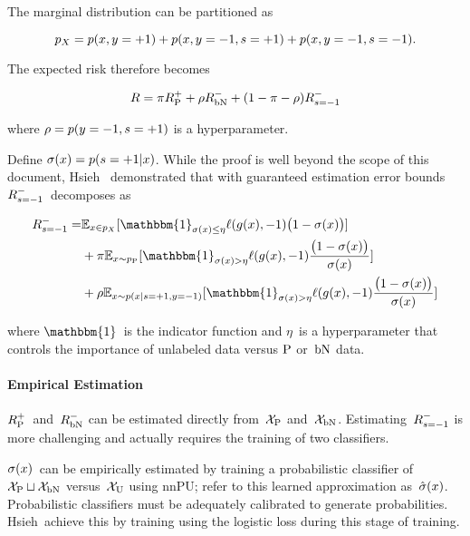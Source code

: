 The marginal distribution can be partitioned as

\begin{equation*}
  p_{X} = p(x, y = {+}1) + p(x, y = {-}1, s = {+}1) + p(x, y = {-}1, s = {-}1) \text{.}
\end{equation*}

\noindent
The expected risk therefore becomes

\begin{equation}\label{eq:Risk:WithBN}
  R = \pi R_{\textnormal{P}}^{{+}} + \rho R_{\textnormal{bN}}^{{-}} + (1 - \pi - \rho) R_{s = {-}1}^{-}
\end{equation}

\noindent
where ${\rho = p(y = {-}1, s = {+}1)}$ is a hyperparameter.

Define ${\sigma(x) = p(s = {+}1 \vert x)}$.  While the proof is well beyond the scope of this document, Hsieh\etal~\cite{Hsieh:2018} demonstrated that with guaranteed estimation error bounds $R_{s = {-}1}^{-}$~decomposes as

\begin{equation}\label{eq:ExpectedRisk:PUbN:Latent}
  \begin{aligned}
    \smrisk = &\mathbb{E}_{\X \in \marginal}\sbrack{\mathbbm{1}_{\sigX \leq \eta} \floss{\decX}{\ncls} \sigdiff} \\
              &+ \prior \mathbb{E}_{\X \sim \pcond} \sbrack{\mathbbm{1}_{\sigX > \eta} \floss{\decX}{\ncls} \frac{\sigdiff}{\sigX}} \\
              &+ \plabel \mathbb{E}_{\X \sim \pDist(\X \vert \latent = \pcls, \y = \ncls)} \sbrack{\mathbbm{1}_{\sigX > \eta} \floss{\decX}{\ncls} \frac{\sigdiff}{\sigX}}
  \end{aligned}
\end{equation}

\noindent
where $\mathbbm{1}$~is the indicator function and $\eta$~is a hyperparameter that controls the importance of unlabeled data versus $\textnormal{P}$ or~$\textnormal{bN}$ data.

\paragraph{Empirical Estimation} $R_{\textnormal{P}}^{{+}}$~and~$R_{\textnormal{bN}}^{{-}}$ can be estimated directly from~$\mathcal{X}_{\textnormal{P}}$ and~$\mathcal{X}_{\textnormal{bN}}$.  Estimating~$R_{s = {-}1}^{-}$ is more challenging and actually requires the training of two classifiers.

$\sigma(x)$~can be empirically estimated by training a probabilistic classifier of ${\mathcal{X}_{\textnormal{P}} \sqcup \mathcal{X}_{\textnormal{bN}}}$ versus~$\mathcal{X}_{\textnormal{U}}$ using nnPU; refer to this learned approximation as~$\hat{\sigma}(x)$.  Probabilistic classifiers must be adequately calibrated to generate probabilities.  Hsieh\etal\ achieve this by training using the logistic loss during this stage of training.

